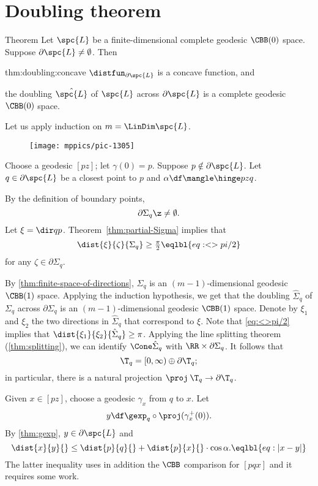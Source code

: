 \section{Doubling theorem}

\begin{thm}{Theorem}\label{thm:doubling}
Let $\spc{L}$ be a finite-dimensional complete geodesic $\CBB(0)$ space.
Suppose $\partial \spc{L}\ne \emptyset$.
Then 
\begin{subthm}{thm:doubling:concave}
$\distfun_{\partial \spc{L}}$ is a concave function, and
\end{subthm}

\begin{subthm}{}
the doubling $\hat{\spc{L}}$ of $\spc{L}$ across $\partial \spc{L}$ is a complete geodesic $\CBB(0)$ space.
\end{subthm}

\end{thm}


Let us apply induction on $m=\LinDim \spc{L}$.

\begin{wrapfigure}{r}{30mm}
\vskip-2mm
\centering
\texttt{[image: mppics/pic-1305]}
\end{wrapfigure}

Choose a geodesic $[pz]$; let $\gamma(0)=p$.
Suppose $p\notin\partial \spc{L}$.
Let $q\in \partial\spc{L}$ be a closest point to $p$ and $\alpha\df\mangle\hinge pzq$.

By the definition of boundary points, 
\[\partial \Sigma_q\z\ne\emptyset.\]
Let $\xi=\dir qp$.
Theorem~\ref{thm:partial-Sigma} implies that 
\[\dist{\xi}{\zeta}{\Sigma_q}\ge \tfrac\pi2
\eqlbl{eq:<>pi/2}\]
for any $\zeta\in\partial\Sigma_q$.

By \ref{thm:finite-space-of-directions}, $\Sigma_q$ is an $(m-1)$-dimensional geodesic $\CBB(1)$ space.
Applying the induction hypothesis, we get that the doubling $\hat\Sigma_q$ of $\Sigma_q$ across $\partial \Sigma_q$ is an $(m-1)$-dimensional geodesic $\CBB(1)$ space.
Denote by $\xi_1$ and $\xi_2$ the two directions in $\hat\Sigma_q$ that correspond to $\xi$.
Note that \ref{eq:<>pi/2} implies that $\dist{\xi_1}{\xi_2}{\hat\Sigma_q}\ge \pi$.
Applying the line splitting theorem (\ref{thm:splitting}), we can identify 
$\Cone\hat\Sigma_q$ with $\RR\times \partial\Sigma_q$.
It follows that 
\[\T_q=[0,\infty)\oplus \partial\T_q;\]
in particular, there is a natural projection $\proj\:\T_q\to \partial\T_q$.

Given $x\in [pz]$, choose a geodesic $\gamma_x$ from $q$ to $x$.
Let 
\[y
\df
\gexp_q\circ\proj(\gamma^+_x(0)).\]
By \ref{thm:gexp}, $y\in \partial\spc{L}$ and 
\[\dist{x}{y}{}\le \dist{p}{q}{}+\dist{p}{x}{}\cdot \cos\alpha.\eqlbl{eq:|x-y|}\]
The latter inequality uses in addition the $\CBB$ comparison for $[pqx]$ and it requires some work.

